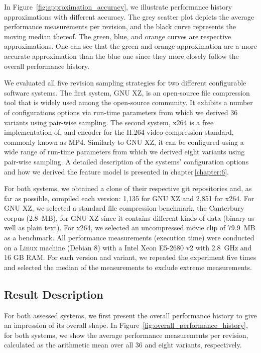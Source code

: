In Figure~\ref{fig:approximation_accuracy}, we illustrate performance history
approximations with different accuracy. The grey scatter plot depicts the
average performance measurements per revision, and the black curve represents
the moving median thereof. The green, blue, and orange curves are respective
approximations. One can see that the green and orange approximation are a more
accurate approximation than the blue one since they more closely follow the
overall performance history.

We evaluated all five revision sampling strategies
for two different configurable software systems. The first system, GNU XZ, is
an open-source file compression tool that is widely used among the open-source
community. It exhibits a number of configurations options via run-time
parameters from which we derived 36 variants using pair-wise sampling. The
second system, x264 is a free implementation of, and encoder for the H.264
video compression standard, commonly known as MP4. Similarly to GNU XZ, it can
be configured using a wide range of run-time parameters from which we derived
eight variants using pair-wise sampling.  A detailed description of the systems’
configuration options and how we derived the feature model is presented in
chapter\,\ref{chapter:6}.

For both systems, we obtained a clone of
their respective git repositories and, as far as possible, compiled each
version: 1,135 for GNU XZ and 2,851 for x264. For GNU XZ, we selected a
standard file compression benchmark, the Canterbury corpus (2.8~MB), for GNU XZ
since it contains different kinds of data (binary as well as plain text). For
x264, we selected an uncompressed movie clip of 79.9~MB as a benchmark. All
performance measurements (execution time) were conducted on a Linux machine
(Debian 8) with a Intel Xeon E5-2680 v2 with 2.8~GHz and 16 GB RAM. For each
version and variant, we repeated the experiment five times and selected the
median of the measurements to exclude extreme measurements.

\subsection{Result Description}
For both assessed systems, we first present the overall performance history to
give an impression of its overall shape. In
Figure~\ref{fig:overall_performance_history}, for both systems, we show the
average performance measurements per revision, calculated as the arithmetic
mean over all 36 and eight variants, respectively.

